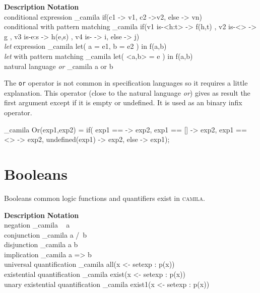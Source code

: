 \documentclass[english,a4paper]{article}
\def\camila{\textsc{camila}}
\begin{document}
\begin{framed}
\noindent \textbf{Description}  \hfill  \textbf{Notation} \ \  \\
 conditional expression            \dotfill \_camila{ if(c1 -> v1, c2 ->v2, else -> vn)} \\[1mm]
 conditional with pattern matching \dotfill \_camila{ if(v1 is-<h:t> -> f(h,t) ,
                                                         v2 is-<>    -> g  ,
                                                         v3 is-{e:s} -> h(e,s) ,
                                                         v4 is-{}    -> i,
                                                         else        -> j) } \\[1mm]
 \emph{let} expression             \dotfill \_camila{ let( a = e1, b = e2 )
                                                      in f(a,b) } \\[1mm]
 \emph{let} with pattern matching  \dotfill \_camila{ let( <a,b> = e )
                                                      in f(a,b) } \\[1mm]
 natural language \emph{or}        \dotfill \_camila{ a or b }
\end{framed}

The \texttt{or} operator is not common in specification languages so it
requires a little explanation. This operator (close to the natural
language \emph{or}) gives as result the first argument except if it is
empty or undefined. It is used as an binary infix operator.

\_camila{
  Or(exp1,exp2)  = if(
         exp1 == {}  -> exp2,
         exp1 == []  -> exp2,
         exp1 == <>  -> exp2,
         undefined(exp1) -> exp2,
         else        -> exp1);
}


\section{Booleans}

Booleans common logic functions and quantifiers exist in \camila{}.

\begin{framed}
\noindent \textbf{Description}  \hfill  \textbf{Notation} \ \  \\
 negation                          \dotfill \_camila{ ~ a } \\
 conjunction                       \dotfill \_camila{ a /\ b } \\
 disjunction                       \dotfill \_camila{ a \/ b } \\
 implication                       \dotfill \_camila{ a => b } \\
 universal quantification          \dotfill \_camila{ all(x <- setexp : p(x))  } \\
 existential quantification        \dotfill \_camila{ exist(x <- setexp : p(x))  } \\
 unary existential quantification  \dotfill \_camila{ exist1(x <- setexp : p(x))  } 
\end{framed}
\end{document}
